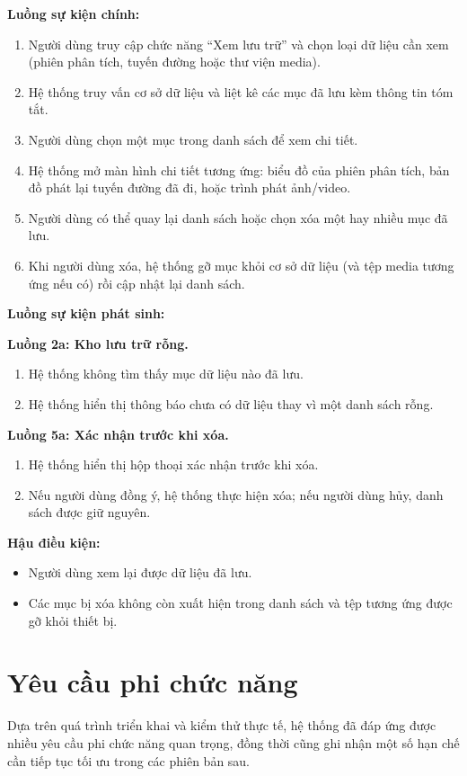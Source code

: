 \documentclass[../DoAn.tex]{subfiles}
\begin{document}
\textbf{Luồng sự kiện chính:}
\begin{enumerate}
    \item Người dùng truy cập chức năng ``Xem lưu trữ'' và chọn loại dữ liệu cần xem (phiên phân tích, tuyến đường hoặc thư viện media).
    \item Hệ thống truy vấn cơ sở dữ liệu và liệt kê các mục đã lưu kèm thông tin tóm tắt.
    \item Người dùng chọn một mục trong danh sách để xem chi tiết.
    \item Hệ thống mở màn hình chi tiết tương ứng: biểu đồ của phiên phân tích, bản đồ phát lại tuyến đường đã đi, hoặc trình phát ảnh/video.
    \item Người dùng có thể quay lại danh sách hoặc chọn xóa một hay nhiều mục đã lưu.
    \item Khi người dùng xóa, hệ thống gỡ mục khỏi cơ sở dữ liệu (và tệp media tương ứng nếu có) rồi cập nhật lại danh sách.
\end{enumerate}

\textbf{Luồng sự kiện phát sinh:}

\textbf{Luồng 2a: Kho lưu trữ rỗng.}
\begin{enumerate}[label=2a.\arabic*., leftmargin=2.6em, align=left, labelsep=0.5em]
    \item Hệ thống không tìm thấy mục dữ liệu nào đã lưu.
    \item Hệ thống hiển thị thông báo chưa có dữ liệu thay vì một danh sách rỗng.
\end{enumerate}

\textbf{Luồng 5a: Xác nhận trước khi xóa.}
\begin{enumerate}[label=5a.\arabic*., leftmargin=2.6em, align=left, labelsep=0.5em]
    \item Hệ thống hiển thị hộp thoại xác nhận trước khi xóa.
    \item Nếu người dùng đồng ý, hệ thống thực hiện xóa; nếu người dùng hủy, danh sách được giữ nguyên.
\end{enumerate}

\textbf{Hậu điều kiện:}
\begin{itemize}
    \item Người dùng xem lại được dữ liệu đã lưu.
    \item Các mục bị xóa không còn xuất hiện trong danh sách và tệp tương ứng được gỡ khỏi thiết bị.
\end{itemize}

\section{Yêu cầu phi chức năng}
\label{section:2.4}
Dựa trên quá trình triển khai và kiểm thử thực tế, hệ thống đã đáp ứng được nhiều yêu cầu phi chức năng quan trọng, đồng thời cũng ghi nhận một số hạn chế cần tiếp tục tối ưu trong các phiên bản sau.
\end{document}
